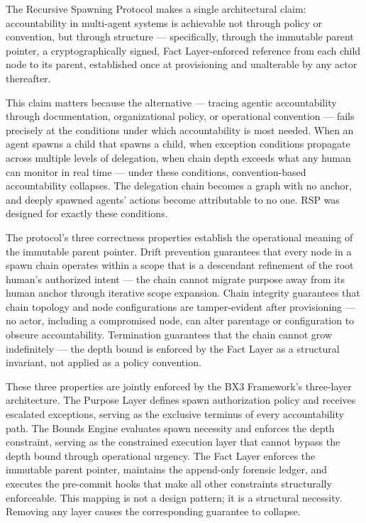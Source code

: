 The Recursive Spawning Protocol makes a single architectural claim: accountability in multi-agent systems is achievable not through policy or convention, but through structure --- specifically, through the immutable parent pointer, a cryptographically signed, Fact Layer-enforced reference from each child node to its parent, established once at provisioning and unalterable by any actor thereafter.

This claim matters because the alternative --- tracing agentic accountability through documentation, organizational policy, or operational convention --- fails precisely at the conditions under which accountability is most needed. When an agent spawns a child that spawns a child, when exception conditions propagate across multiple levels of delegation, when chain depth exceeds what any human can monitor in real time --- under these conditions, convention-based accountability collapses. The delegation chain becomes a graph with no anchor, and deeply spawned agents' actions become attributable to no one. RSP was designed for exactly these conditions.

The protocol's three correctness properties establish the operational meaning of the immutable parent pointer. Drift prevention guarantees that every node in a spawn chain operates within a scope that is a descendant refinement of the root human's authorized intent --- the chain cannot migrate purpose away from its human anchor through iterative scope expansion. Chain integrity guarantees that chain topology and node configurations are tamper-evident after provisioning --- no actor, including a compromised node, can alter parentage or configuration to obscure accountability. Termination guarantees that the chain cannot grow indefinitely --- the depth bound is enforced by the Fact Layer as a structural invariant, not applied as a policy convention.

These three properties are jointly enforced by the BX3 Framework's three-layer architecture. The Purpose Layer defines spawn authorization policy and receives escalated exceptions, serving as the exclusive terminus of every accountability path. The Bounds Engine evaluates spawn necessity and enforces the depth constraint, serving as the constrained execution layer that cannot bypass the depth bound through operational urgency. The Fact Layer enforces the immutable parent pointer, maintains the append-only forensic ledger, and executes the pre-commit hooks that make all other constraints structurally enforceable. This mapping is not a design pattern; it is a structural necessity. Removing any layer causes the corresponding guarantee to collapse.

